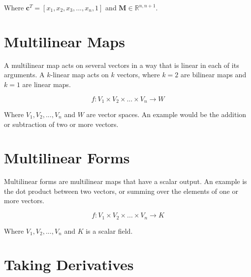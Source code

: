 Where $\mathbf{c}^T = \left[x_1,x_2,x_3,...,x_n,1\right]$ and $\mathbf{M} \in \mathbb{R}^{n,n+1}$.

\section{Multilinear Maps}

A multilinear map acts on several vectors in a way that is linear in each of its arguments. A $k$-linear map acts on $k$ vectors, where $k=2$ are bilinear maps and $k=1$ are linear maps.

\begin{equation}	
f: V_1 \times V_2 \times ... \times V_n \rightarrow W
\end{equation}

Where $V_1, V_2, ... , V_n$ and $W$ are vector spaces. An example would be the addition or subtraction of two or more vectors.

\section{Multilinear Forms}
Multilinear forms are multilinear maps that have a scalar output. An example is the dot product between two vectors, or summing over the elements of one or more vectors.

\begin{equation}
f: V_1 \times V_2 \times ... \times V_n \rightarrow K
\end{equation}

Where $V_1, V_2, ... , V_n$ and $K$ is a scalar field.





\section{Taking Derivatives}

